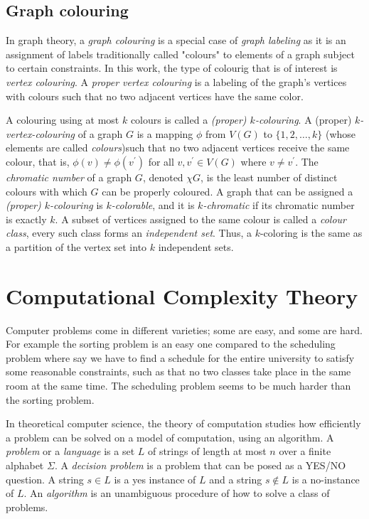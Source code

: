 \subsection{Graph colouring}
In graph theory, a \textit{graph colouring} is a special case of \textit{graph labeling} as it is an assignment of labels traditionally
called "colours" to elements of a graph subject to certain constraints. In this work, the type of colourig that is of interest is
\textit{vertex colouring}. A \textit{proper vertex colouring} is a labeling of the graph’s vertices with colours such that no two adjacent
vertices have the same color.

A colouring using at most $k$ colours is called a \textit{(proper) $k$-colouring}.
A (proper) \textit{$k$-vertex-colouring} of a graph $G$ is a mapping $\phi$ from $V(G)$ to $\{1, 2, \dots, k\}$ (whose elements are called
\textit{colours})such that no two adjacent vertices receive the same colour, that is, $\phi(v) \neq \phi(v^{'})$ for all $v, v^{'} \in V(G)$
where $v \neq v^{'}$.
The \textit{chromatic number} of a graph $G$, denoted
$\chi{G}$, is the least number of distinct colours with which $G$ can be properly coloured. A graph that can be assigned a \textit{(proper) $k$-colouring}
is \textit{$k$-colorable}, and it is \textit{$k$-chromatic} if its chromatic number is exactly $k$. A subset of vertices assigned to the same colour
is called a \textit{colour class}, every such class forms an \textit{independent set}. Thus, a $k$-coloring is the same as a partition of the
vertex set into $k$ independent sets.


\section{Computational Complexity Theory} \label{sec:complexity}
Computer problems come in different varieties; some are easy, and some are hard. For example the sorting problem is an easy one compared to the
scheduling problem where say we have to find a schedule for the entire university to satisfy some reasonable constraints, such as that no two classes
take place in the same room at the same time. The scheduling problem seems to be much harder than the sorting problem.

In theoretical computer science, the theory of computation studies how efficiently a problem can be solved on a model of computation, using an
algorithm. A \textit{problem} or a \textit{language} is a set $L$ of strings of length at most $n$ over a finite alphabet $\Sigma$.
A \textit{decision problem} is a problem that can be posed as a YES/NO question. A string $s \in L$ is a yes instance of $L$ and a string $s \notin L$ is
a no-instance of $L$. An \textit{algorithm} is an unambiguous procedure of how to solve a class of problems.

